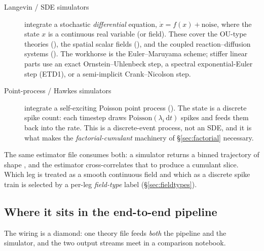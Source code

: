 \begin{description}
  \item[Langevin / SDE simulators] integrate a stochastic \emph{differential}
        equation, $\dot x = f(x) + \text{noise}$, where the state $x$ is a
        continuous real variable (or field). These cover the OU-type theories
        (), the spatial scalar fields
        (), and the coupled reaction--diffusion
        systems (). The workhorse is the
        Euler--Maruyama scheme; stiffer linear parts use an exact
        Ornstein--Uhlenbeck step, a spectral exponential-Euler step (ETD1), or a
        semi-implicit Crank--Nicolson step.
  \item[Point-process / Hawkes simulators] integrate a self-exciting Poisson
        point process (). The state is a discrete
        spike count: each timestep draws $\mathrm{Poisson}(\lambda_i\,\mathrm{d}t)$
        spikes and feeds them back into the rate. This is a discrete-event
        process, not an SDE, and it is what makes the \emph{factorial-cumulant}
        machinery of \S\ref{sec:factorial} necessary.
\end{description}

The same estimator file consumes both: a simulator returns a binned trajectory
of shape , and the estimator cross-correlates that to
produce a cumulant slice. Which leg is treated as a smooth continuous field and
which as a discrete spike train is selected by a per-leg \emph{field-type} label
(\S\ref{sec:fieldtypes}).

\subsection{Where it sits in the end-to-end pipeline}

The wiring is a diamond: one theory file feeds \emph{both} the pipeline and the
simulator, and the two output streams meet in a comparison notebook.

